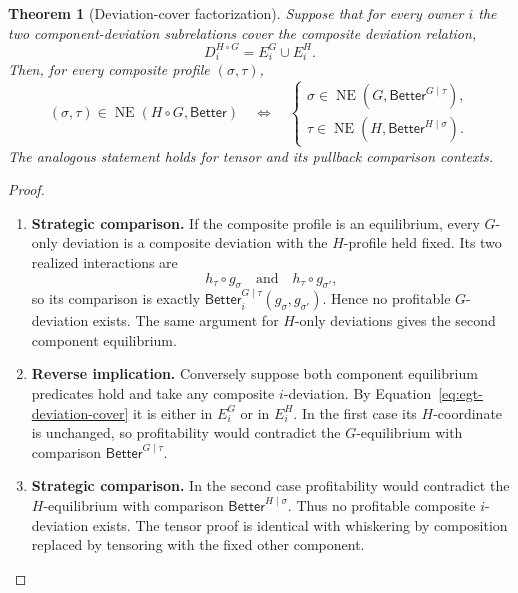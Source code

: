 \documentclass[11pt,a4paper]{article}
\numberwithin{equation}{section}
\newtheorem{theorem}{Theorem}[section]
\theoremstyle{definition}
\theoremstyle{remark}
\theoremstyle{plain}
\begin{document}
\begin{theorem}[Deviation-cover factorization]
\label{thm:egt-deviation-cover-factorization}
Suppose that for every owner $i$ the two component-deviation subrelations
cover the composite deviation relation,
\begin{equation}
\label{eq:egt-deviation-cover}
 D_i^{H\circ G}=E_i^G\cup E_i^H.
\end{equation}
Then, for every composite profile $(\sigma,\tau)$,
\[
 (\sigma,\tau)\in\operatorname{NE}(H\circ G,\mathsf{Better})
 \quad\Longleftrightarrow\quad
 \begin{cases}
 \sigma\in\operatorname{NE}
      (G,\mathsf{Better}^{G\mid\tau}),\\
 \tau\in\operatorname{NE}
      (H,\mathsf{Better}^{H\mid\sigma}).
 \end{cases}
\]
The analogous statement holds for tensor and its pullback comparison
contexts.
\end{theorem}

\begin{proof}
\leavevmode
\begin{enumerate}[label=\textup{(\arabic*)},leftmargin=*,itemsep=4pt,topsep=3pt]
  \item \textbf{Strategic comparison.} If the composite profile is an equilibrium, every $G$-only deviation is a
composite deviation with the $H$-profile held fixed. Its two realized
interactions are
\[
 h_\tau\circ g_\sigma
 \quad\text{and}\quad
 h_\tau\circ g_{\sigma'},
\]
so its comparison is exactly
$\mathsf{Better}^{G\mid\tau}_i(g_\sigma,g_{\sigma'})$. Hence no profitable
$G$-deviation exists. The same argument for $H$-only deviations gives the
second component equilibrium.
  \item \textbf{Reverse implication.} Conversely suppose both component equilibrium predicates hold and take any
composite $i$-deviation. By
Equation~\eqref{eq:egt-deviation-cover} it is either in $E_i^G$ or in
$E_i^H$. In the first case its $H$-coordinate is unchanged, so profitability
would contradict the $G$-equilibrium with comparison
$\mathsf{Better}^{G\mid\tau}$.
  \item \textbf{Strategic comparison.} In the second case profitability would
contradict the $H$-equilibrium with comparison
$\mathsf{Better}^{H\mid\sigma}$. Thus no profitable composite
$i$-deviation exists. The tensor proof is identical with whiskering by
composition replaced by tensoring with the fixed other component.
\end{enumerate}
\end{proof}
\end{document}
